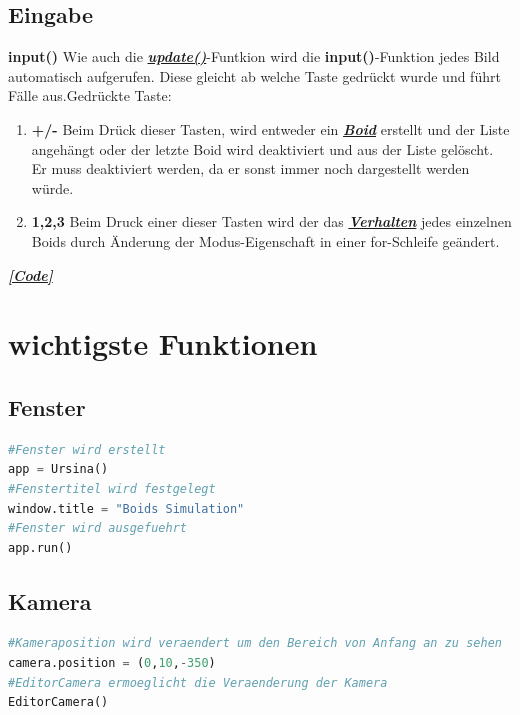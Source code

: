 \documentclass[a4paper, hidelinks, 12pt]{article}
\begin{document}
\subsection{Eingabe}
\textbf{input()}\label{sec:input}
Wie auch die \hyperref[sec:update]{\textbf{\emph{update()}}}-Funtkion\cite{update} wird die \textbf{input()}-Funktion jedes Bild automatisch aufgerufen. Diese gleicht ab welche Taste gedrückt wurde und führt Fälle aus\cite{input}.\newline Gedrückte Taste: 

\begin{enumerate}
\item \textbf{+/-} Beim Drück dieser Tasten, wird entweder ein \hyperref[sec:Boid]{\textbf{\emph{Boid}}} erstellt und der Liste angehängt oder der letzte Boid wird deaktiviert und aus der Liste gelöscht. Er muss deaktiviert werden, da er sonst immer noch dargestellt werden würde.
\item \textbf{1,2,3} Beim Druck einer dieser Tasten wird der das \hyperref[sec:Verhalten]{\textbf{\emph{Verhalten}}} jedes einzelnen Boids durch Änderung der Modus-Eigenschaft in einer for-Schleife geändert.
	
\end{enumerate}
\hyperref[Codeinput]{\textbf{\emph{[Code]}}}


\newpage
\section{wichtigste Funktionen}
\subsection{Fenster}\label{CodeFenster}
\begin{lstlisting}[style=mystyle, language=Python]
#Fenster wird erstellt
app = Ursina()
#Fenstertitel wird festgelegt
window.title = "Boids Simulation"
#Fenster wird ausgefuehrt
app.run()
\end{lstlisting}
\subsection{Kamera}\label{Kamera}
\begin{lstlisting}[style=mystyle, language=Python]
#Kameraposition wird veraendert um den Bereich von Anfang an zu sehen
camera.position = (0,10,-350)
#EditorCamera ermoeglicht die Veraenderung der Kamera
EditorCamera()
\end{lstlisting}
\end{document}

